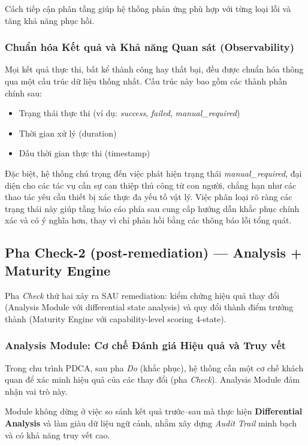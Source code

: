 Cách tiếp cận phân tầng giúp hệ thống phản ứng phù hợp với từng loại lỗi và tăng khả năng phục hồi.

\subsubsection*{Chuẩn hóa Kết quả và Khả năng Quan sát (Observability)}

Mọi kết quả thực thi, bất kể thành công hay thất bại, đều được chuẩn hóa thông qua một cấu trúc dữ liệu thống nhất. Cấu trúc này bao gồm các thành phần chính sau:
\begin{itemize}
  \item Trạng thái thực thi (ví dụ: \textit{success}, \textit{failed}, \textit{manual\_required})
  \item Thời gian xử lý (duration)
  \item Dấu thời gian thực thi (timestamp)
\end{itemize}

Đặc biệt, hệ thống chú trọng đến việc phát hiện trạng thái \textit{manual\_required}, đại diện cho các tác vụ cần sự can thiệp thủ công từ con người, chẳng hạn như các thao tác yêu cầu thiết bị xác thực đa yếu tố vật lý. Việc phân loại rõ ràng các trạng thái này giúp tầng báo cáo phía sau cung cấp hướng dẫn khắc phục chính xác và có ý nghĩa hơn, thay vì chỉ phản hồi bằng các thông báo lỗi tổng quát.

\subsection{Pha Check-2 (post-remediation) --- Analysis + Maturity Engine}
\label{sec:phase_check2}

Pha \textit{Check} thứ hai xảy ra SAU remediation: kiểm chứng hiệu quả thay đổi (Analysis Module với differential state analysis) và quy đổi thành điểm trưởng thành (Maturity Engine với capability-level scoring 4-state).

\subsubsection*{Analysis Module: Cơ chế Đánh giá Hiệu quả và Truy vết}

Trong chu trình PDCA, sau pha \textit{Do} (khắc phục), hệ thống cần một cơ chế khách quan để xác minh hiệu quả của các thay đổi (pha \textit{Check}). Analysis Module đảm nhận vai trò này.

Module không dừng ở việc so sánh kết quả trước--sau mà thực hiện \textbf{Differential Analysis} và làm giàu dữ liệu ngữ cảnh, nhằm xây dựng \textit{Audit Trail} minh bạch và có khả năng truy vết cao.

